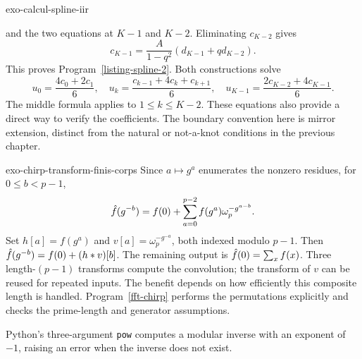 \begin{correction}{exo-calcul-spline-iir}
\begin{enumerate}
and the two equations at $K-1$ and $K-2$. Eliminating $c_{K-2}$ gives
\[
 c_{K-1}=\frac{A}{1-q^2}(d_{K-1}+qd_{K-2}).
\]
This proves Program~\ref{listing-spline-2}. Both constructions solve
\[
 u_0=\frac{4c_0+2c_1}{6},\quad
 u_k=\frac{c_{k-1}+4c_k+c_{k+1}}6,\quad
 u_{K-1}=\frac{2c_{K-2}+4c_{K-1}}6.
\]
The middle formula applies to $1\leq k\leq K-2$. These equations also
provide a direct way to verify the coefficients. The boundary convention
here is mirror extension, distinct from the natural or not-a-knot
conditions in the previous chapter.
\begin{listing}[H]
\caption{The same mirror-boundary spline prefilter as a cascade.}
\label{listing-spline-2}
\end{listing}
\end{enumerate}
\end{correction}

\begin{correction}{exo-chirp-transform-finis-corps}
Since $a\mapsto g^a$ enumerates the nonzero residues, for $0\leq b<p-1$,
\[
 \hat{f}(g^{-b})=f(0)+\sum_{a=0}^{p-2}f(g^a)\omega_p^{-g^{a-b}}.
\]
Set $h[a]=f(g^a)$ and $v[a]=\omega_p^{-g^{-a}}$, both indexed modulo
$p-1$. Then $\hat{f}(g^{-b})=f(0)+(h*v)[b]$. The remaining output is
$\hat{f}(0)=\sum_x f(x)$. Three length-$(p-1)$ transforms compute the
convolution; the transform of $v$ can be reused for repeated inputs.
The benefit depends on how efficiently this composite length is handled.
Program~\ref{fft-chirp} performs the permutations explicitly and checks
the prime-length and generator assumptions.
\begin{listing}[H]
\caption{Rader's prime-length FFT with explicit input and output permutations.}
\label{fft-chirp}
\end{listing}
Python's three-argument \texttt{pow} computes a modular inverse with an
exponent of $-1$, raising an error when the inverse does not exist.
\begin{listing}[H]
\caption{Exact modular inversion using Python integers.}
\label{listing-invmod}
\end{listing}
\end{correction}

